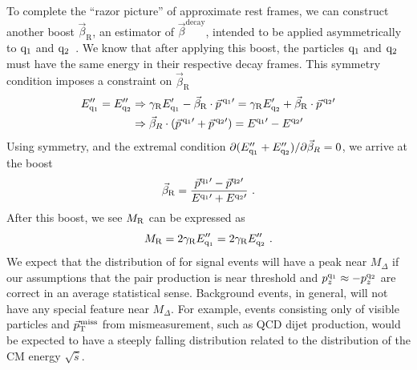 To complete the ``razor picture'' of approximate rest frames, we can
construct another boost $\vec\beta_{\mathrm R}$, an estimator of $\vec\beta^{\mathrm{decay}}$, intended to be
applied asymmetrically to $\mathrm{q}_1$ and
$\mathrm{q}_2$~\cite{rogan,SuperRazor}. We know that after applying this
boost, the particles $\mathrm{q}_1$ and $\mathrm{q}_2$ must have the same energy in
their respective decay frames. This symmetry condition imposes a
constraint on $\vec\beta_{\mathrm R}$
\begin{align}
E_{\mathrm{q}_1}^{\prime\prime} = E_{\mathrm{q}_2}^{\prime\prime} &\Rightarrow \gamma_{\mathrm R}E_{\mathrm{q}_1}^{\prime} - \vec\beta_{\mathrm
  R}\cdot \vec p^{\,\mathrm{q}_1\prime} =  \gamma_{\mathrm R}E_{\mathrm{q}_2}^{\prime} + \vec\beta_{\mathrm
  R}\cdot \vec p^{\,\mathrm{q}_2\prime} \\
&\Rightarrow \vec\beta_R\cdot(\vec p^{\,\mathrm{q}_1\prime} + \vec
  p^{\,\mathrm{q}_2\prime}) = E^{\mathrm{q}_1\prime}- E^{\mathrm{q}_2\prime}
\end{align}
Using symmetry, and the extremal condition $\partial (
E_{\mathrm{q}_1}^{\prime\prime} + E_{\mathrm{q}_2}^{\prime\prime} )/ \partial
\vec\beta_R = 0$, we arrive at the boost
\begin{equation}
\vec\beta_{\mathrm{R}} = 
\frac{\vec p^{\mathrm{q}_1\prime} - \vec p^{\mathrm{q}_2\prime}}{E^{\mathrm{q}_1\prime}+ E^{\mathrm{q}_2\prime}}~.
\end{equation}
After this boost, we see $M_\mathrm{R}$ can be expressed as 
\begin{equation}
M_\mathrm{R} =2\gamma_{\mathrm R} E_{\mathrm{q}_1}^{\prime\prime} = 2\gamma_{\mathrm R} E_{\mathrm{q}_2}^{\prime\prime} ~.
\end{equation}
We expect that the distribution of \MR for signal events will have a
peak near $M_{\Delta}$ if our assumptions that the pair production is near threshold
and $p^{\mathrm{q}_1}_z \approx -p^{\mathrm{q}_2}_z$ are correct in an average
statistical sense. Background events, in general, will not have
any special feature near $M_{\Delta}$. For example, events consisting
only of visible particles and ${\vec p}_{\mathrm{T}}^{\kern1pt\text{miss}}$ from mismeasurement, such
as QCD dijet production, would be expected to have a steeply falling \MR distribution
related to the distribution of the CM energy $\sqrt{\hat{s}}$.

